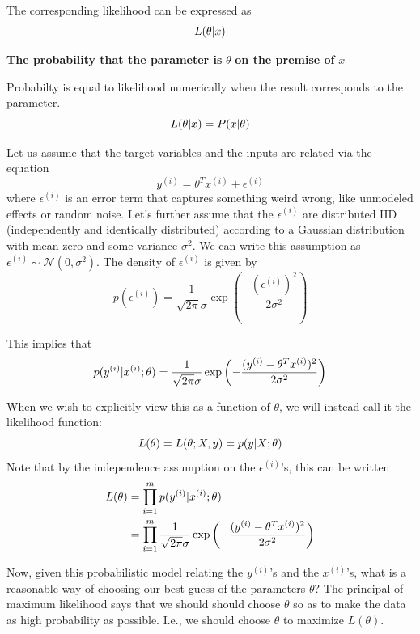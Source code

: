 \documentclass[fontset=windows,pass]{article}
\numberwithin{equation}{subsection} %
\begin{document}
The corresponding likelihood can be expressed as
\begin{equation*}
	L(\theta \arrowvert x)
\end{equation*}
\begin{center}
	\textbf{The probability that the parameter is} $\theta$ \textbf{on the premise of} $x$
\end{center}

Probabilty is equal to likelihood numerically when the result corresponds to the parameter.
\begin{equation*}
	L(\theta \arrowvert x) = P(x \arrowvert \theta)
\end{equation*}

Let us assume that the target variables and the inputs are related via the equation
\[y^{(i)} = \theta^{T}x^{(i)} + \epsilon^{(i)}\]
where $\epsilon^{(i)}$ is an error term that captures something weird wrong, like unmodeled effects or random noise.
Let's further assume that the $\epsilon^{(i)}$ are distributed IID (independently and identically distributed) according to a Gaussian distribution
with mean zero and some variance $\sigma^2$. We can write this assumption as $\epsilon^{(i)} \sim \mathcal{N}(0, \sigma^2)$.
The density of $\epsilon^{(i)}$ is given by
\[
	p(\epsilon^{(i)}) = \frac{1}{\sqrt{2\pi}\sigma} \exp\left(-\frac{(\epsilon^{(i)})^2}{2\sigma^2}\right)
\]

This implies that
\[
	p(y^{(i)}\arrowvert x^{(i)}; \theta) = \frac{1}{\sqrt{2\pi}\sigma} \exp\left(-\frac{(y^{(i)}-\theta^{T}x^{(i)})^2}{2\sigma^2}\right)
\]

When we wish to explicitly view this as a function of $\theta$, we will instead call it the likelihood function:
\[
	L(\theta) = L(\theta; X,y) = p(y\arrowvert X;\theta)
\]
Note that by the independence assumption on the $\epsilon^{(i)}$'s, this can be written
\begin{equation}
	\begin{aligned}
		L(\theta) & = \prod_{i=1}^{m} p(y^{(i)}\arrowvert x^{(i)}; \theta)\\
		          & = \prod_{i=1}^{m} \frac{1}{\sqrt{2\pi}\sigma} \exp\left(-\frac{(y^{(i)}-\theta^{T}x^{(i)})^2}{2\sigma^2}\right)
	\end{aligned}
\end{equation}

Now, given this probabilistic model relating the $y^{(i)}$'s and the $x^{(i)}$'s, what is a reasonable way of choosing our best guess of the 
parameters $\theta$? The principal of maximum likelihood says that we should should choose $\theta$ so as to make the data as high probability 
as possible. I.e., we should choose $\theta$ to maximize $L(\theta)$.
\end{document}
